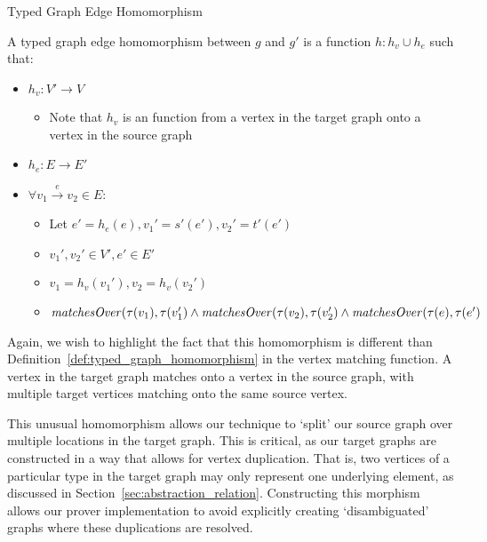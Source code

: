 \begin{definition}{Typed Graph Edge Homomorphism\\}
\label{def:typed_graph_edge_homomorphism}

A typed graph edge homomorphism between $g$ and $g'$ is a function $h: h_v \cup h_e$ such that:
\begin{itemize}
\item $h_v: V'\rightarrow V$
\begin{itemize}
\item Note that $h_v$ is an function from a vertex in the target graph onto a vertex in the source graph
\end{itemize}
\item $h_e: E\rightarrow E'$
\item $\forall v_1 \xrightarrow{e} v_2\in E$:
\begin{itemize}
\item Let $e' = h_e(e), v_1' = s'(e'), v_2' = t'(e')$
\item $v_1', v_2' \in V', e' \in E'$
\item $v_1 = h_v(v_1'), v_2 = h_v(v_2')$
\item $\mathit{matchesOver}(\tau(v_1), \tau(v_1') \land \\\mathit{matchesOver}(\tau(v_2), \tau(v_2') \land\\ \mathit{matchesOver}(\tau(e), \tau(e')$
\end{itemize}

\end{itemize}  
\end{definition}

Again, we wish to highlight the fact that this homomorphism is different than Definition~\ref{def:typed_graph_homomorphism} in the vertex matching function. A vertex in the target graph matches onto a vertex in the source graph, with multiple target vertices matching onto the same source vertex. 

This unusual homomorphism allows our technique to `split' our source graph over multiple locations in the target graph. This is critical, as our target graphs are constructed in a way that allows for vertex duplication. That is, two vertices of a particular type in the target graph may only represent one underlying element, as discussed in Section~\ref{sec:abstraction_relation}. Constructing this morphism allows our prover implementation to avoid explicitly creating `disambiguated' graphs where these duplications are resolved.


